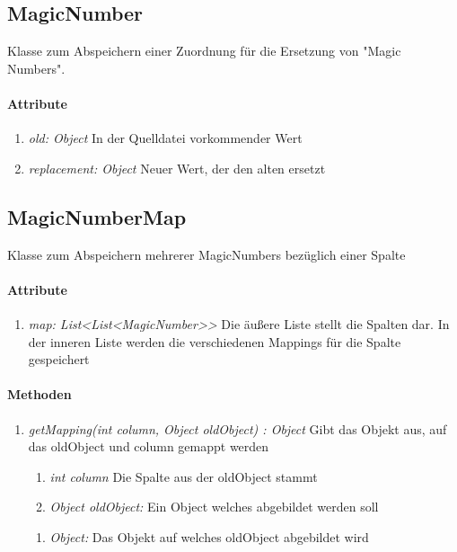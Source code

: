 \subsection*{MagicNumber}\label{magic}
Klasse zum Abspeichern einer Zuordnung für die Ersetzung von \string"Magic Numbers\string".

\paragraph{Attribute}
\begin{enumerate}[-]
	\item \textit{old: Object} In der Quelldatei vorkommender Wert
	\item \textit{replacement: Object} Neuer Wert, der den alten ersetzt
\end{enumerate}


\subsection*{MagicNumberMap}\label{magicMap}
Klasse zum Abspeichern mehrerer MagicNumbers bezüglich einer Spalte

\paragraph{Attribute}
\begin{enumerate}[-]
	\item \textit{map: List<List<MagicNumber>{}>} Die äußere Liste stellt die Spalten dar. In der inneren Liste werden die verschiedenen Mappings für die Spalte gespeichert
\end{enumerate}

\paragraph{Methoden}
\begin{enumerate}[+]
	\item \textit{getMapping(int column, Object oldObject) : Object} Gibt das Objekt aus, auf das oldObject und column gemappt werden
	
	\begin{enumerate}[$\bullet$]
		\item \textit{int column} Die Spalte aus der oldObject stammt
		\item \textit{Object oldObject:} Ein Object welches abgebildet werden soll
	\end{enumerate}
	\vspace{-0.2cm}
	\begin{enumerate}[$\circ$]
		\item \textit{Object:} Das Objekt auf welches oldObject abgebildet wird
	\end{enumerate}
\end{enumerate}